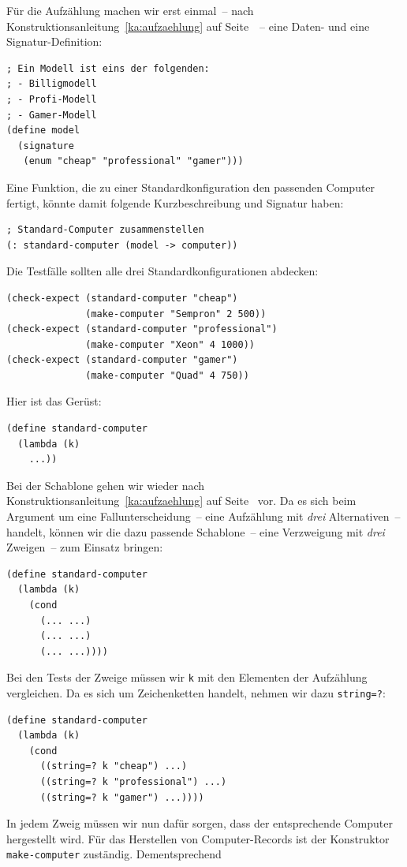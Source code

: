 Für die Aufzählung machen wir erst einmal~-- nach
Konstruktionsanleitung~\ref{ka:aufzaehlung} auf
Seite~\pageref{ka:aufzaehlung}~-- eine Daten- und eine
Signatur-Definition:
%
\begin{verbatim}
; Ein Modell ist eins der folgenden:
; - Billigmodell
; - Profi-Modell
; - Gamer-Modell
(define model
  (signature
   (enum "cheap" "professional" "gamer")))
\end{verbatim}
%
Eine Funktion, die zu einer Standardkonfiguration den passenden
Computer fertigt, könnte damit folgende Kurzbeschreibung und Signatur haben:
%
\begin{verbatim}
; Standard-Computer zusammenstellen
(: standard-computer (model -> computer))
\end{verbatim}
%
Die Testfälle sollten alle drei Standardkonfigurationen abdecken:
%
\begin{verbatim}
(check-expect (standard-computer "cheap")
              (make-computer "Sempron" 2 500))
(check-expect (standard-computer "professional")
              (make-computer "Xeon" 4 1000))
(check-expect (standard-computer "gamer")
              (make-computer "Quad" 4 750))
\end{verbatim}
%
Hier ist das Gerüst:
%
\begin{verbatim}
(define standard-computer
  (lambda (k)
    ...))
\end{verbatim}
%
Bei der Schablone gehen wir wieder nach Konstruktionsanleitung~\ref{ka:aufzaehlung} auf
Seite~\pageref{ka:aufzaehlung} vor.
Da es sich beim Argument um eine Fallunterscheidung~-- eine Aufzählung
mit \emph{drei} Alternativen~-- handelt, können wir die
dazu passende Schablone~-- eine Verzweigung mit \emph{drei} Zweigen~--
zum Einsatz bringen:
%
\begin{verbatim}
(define standard-computer
  (lambda (k)
    (cond
      (... ...)
      (... ...)
      (... ...))))
\end{verbatim}
%
Bei den Tests der Zweige müssen wir \texttt{k} mit den Elementen der
Aufzählung vergleichen.  Da es sich um Zeichenketten handelt, nehmen
wir dazu \texttt{string=?}:
%
\begin{verbatim}
(define standard-computer
  (lambda (k)
    (cond
      ((string=? k "cheap") ...)
      ((string=? k "professional") ...)
      ((string=? k "gamer") ...))))
\end{verbatim}
%
In jedem Zweig müssen wir nun dafür sorgen, dass der entsprechende
Computer hergestellt wird.  Für das Herstellen von Computer-Records
ist der Konstruktor \texttt{make-computer} zuständig.  Dementsprechend
